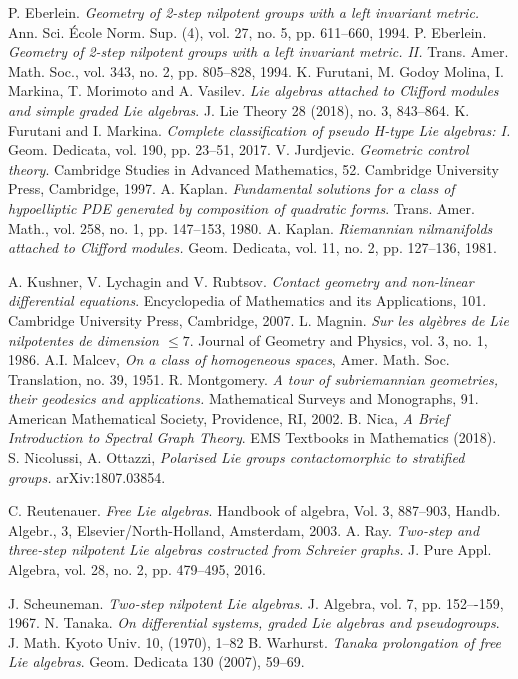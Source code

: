 \documentclass[12pt]{amsart}
\begin{document}
\begin{thebibliography}{99}
 P. Eberlein. {\it Geometry of 2-step nilpotent groups with a left invariant metric.} Ann. Sci. \'{E}cole Norm. Sup. (4), vol. 27, no. 5, pp. 611--660, 1994.
 P. Eberlein. {\it Geometry of 2-step nilpotent groups with a left invariant metric. II.} Trans. Amer. Math. Soc., vol. 343, no. 2, pp. 805--828, 1994.
	 K. Furutani, M. Godoy Molina, I. Markina, T. Morimoto and A. Vasilev. {\it Lie
		algebras attached to Clifford modules and simple graded Lie algebras}. J. Lie Theory 28 (2018), no. 3,
	843–864.
		 K. Furutani and I. Markina. {\it Complete classification of pseudo H-type Lie algebras: I.} Geom. Dedicata, vol. 190, pp. 23--51, 2017.
	 V. Jurdjevic. {\it Geometric control theory}. Cambridge Studies in Advanced Mathematics, 52. Cambridge University Press, Cambridge, 1997.
	 A. Kaplan. {\it Fundamental solutions for a class of hypoelliptic PDE generated by composition of quadratic forms}. Trans. Amer. Math.,  vol. 258, no. 1, pp. 147--153, 1980.
	 A. Kaplan. {\it Riemannian nilmanifolds attached to Clifford modules.} Geom. Dedicata, vol. 11, no. 2, pp. 127--136, 1981.
	
	 A. Kushner,  V. Lychagin and V. Rubtsov. {\it Contact geometry and non-linear differential equations}. Encyclopedia of Mathematics and its Applications, 101. Cambridge University Press, Cambridge, 2007.
	 L. Magnin. {\it Sur les alg\`ebres de Lie nilpotentes de dimension $\leq7$}. Journal of Geometry and Physics, vol. 3, no. 1, 1986.
	 A.I. Malcev, {\it On a class of homogeneous spaces}, Amer. Math. Soc. Translation, no. 39, 1951.
	 R. Montgomery. {\it A tour of subriemannian geometries, their geodesics and applications.} Mathematical Surveys and Monographs, 91. American Mathematical Society, Providence, RI, 2002.
	 B. Nica, {\it A Brief Introduction to Spectral Graph Theory}. EMS Textbooks in Mathematics  (2018).
	 S. Nicolussi, A. Ottazzi, {\it Polarised Lie groups contactomorphic to stratified groups.} arXiv:1807.03854.
	
	 C. Reutenauer. {\it Free Lie algebras}. Handbook of algebra, Vol. 3, 887–903, Handb. Algebr., 3, Elsevier/North-Holland, Amsterdam, 2003.
	 A. Ray. {\it Two-step and three-step nilpotent Lie algebras costructed from Schreier graphs.} J. Pure Appl. Algebra, vol. 28, no. 2, pp. 479--495, 2016.
	
	 J. Scheuneman. {\it Two-step nilpotent Lie algebras}. J. Algebra, vol. 7, pp. 152–-159, 1967.
	 N. Tanaka. {\it On differential systems, graded Lie algebras and pseudogroups}. J. Math. Kyoto Univ.
	10, (1970), 1–82
	 B. Warhurst. {\it Tanaka prolongation of free Lie algebras}. Geom. Dedicata 130 (2007), 59–69.
\end{thebibliography}
\end{document}
